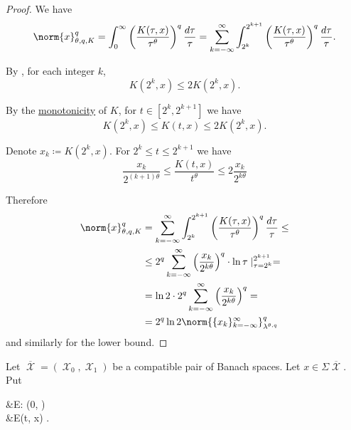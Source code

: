 \begin{proof}
  We have
  \begin{equation*}
    \norm{x}_{\theta,q,K}^q
    =
    \int_0^\infty \left( \frac {K(\tau, x)} {\tau^\theta} \right)^q \frac {d\tau} \tau
    =
    \sum_{k=-\infty}^\infty \int_{2^k}^{2^{k+1}} \left( \frac {K(\tau, x)} {\tau^\theta} \right)^q \frac {d\tau} \tau.
  \end{equation*}

  By , for each integer \( k \),
  \begin{equation*}
    K(2^k, x) \leq 2 K(2^k, x).
  \end{equation*}

  By the \hyperref[def:k_functional_properties/basic]{monotonicity} of \( K \), for \( t \in [2^k, 2^{k+1}] \) we have
  \begin{equation*}
    K(2^k, x) \leq K(t, x) \leq 2 K(2^k, x).
  \end{equation*}

  Denote \( x_k \coloneqq K(2^k, x) \). For \( 2^k \leq t \leq 2^{k+1} \) we have
  \begin{equation*}
    \frac{x_k}{2^{(k+1)\theta}} \leq \frac{K(t, x)}{t^\theta} \leq 2 \frac{x_k}{2^{k\theta}}
  \end{equation*}

  Therefore
  \begin{align*}
    \norm{x}_{\theta,q,K}^q
    &=
    \sum_{k=-\infty}^\infty \int_{2^k}^{2^{k+1}} \left( \frac {K(\tau, x)} {\tau^\theta} \right)^q \frac {d\tau} \tau
    \leq \\ &\leq
    2^q \sum_{k=-\infty}^\infty \left(\frac{x_k}{2^{k\theta}} \right)^q \cdot \ln \tau \mid_{\tau=2^k}^{2^{k+1}}
    = \\ &=
    \ln 2 \cdot 2^q \sum_{k=-\infty}^\infty \left(\frac{x_k}{2^{k\theta}} \right)^q
    = \\ &=
    2^q \ln 2 \norm{\{ x_k \}_{k=-\infty}^\infty}_{\lambda^{\theta,q}}^q
  \end{align*}
  and similarly for the lower bound.
\end{proof}

\begin{definition}\label{def:e_functional}\mcite\cite[174]{Bergh1976}
  Let \( \overline{\mscrX} = (\mscrX_0, \mscrX_1) \) be a compatible pair of Banach spaces. Let \( x \in \Sigma \overline{\mscrX} \). Put
  \begin{alignedeq}\label{eq:def:e_functional}
    &E: (0, \infty) \times {\Sigma \overline{\mscrX}} \\
    &E(t, x) \coloneqq \inf {}.
  \end{alignedeq}
\end{definition}

